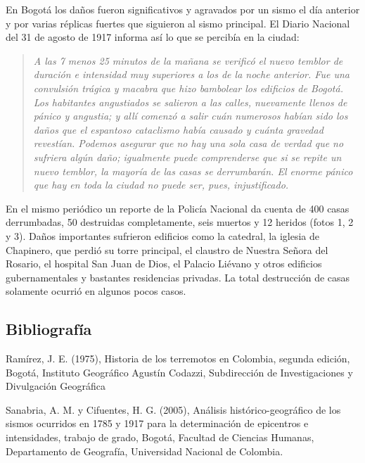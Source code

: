 \documentclass[10pt,twoside]{article}
\begin{document}
\begin{multicols}{2}
En Bogotá los daños fueron significativos y agravados por un sismo el día anterior y por varias réplicas fuertes que siguieron al sismo principal. El Diario Nacional del 31 de agosto de 1917 informa así lo que se percibía en la ciudad:
\begin{quote}
\textit{A las 7 menos 25 minutos de la mañana se verificó el nuevo temblor de duración e intensidad muy superiores a los de la noche anterior. Fue una convulsión trágica y macabra que hizo bambolear los edificios de Bogotá. Los habitantes angustiados se salieron a las calles, nuevamente llenos de pánico y angustia; y allí
comenzó a salir cuán numerosos habían sido los daños que el espantoso cataclismo había causado y cuánta gravedad revestían. Podemos asegurar que no hay una sola casa de verdad que no sufriera algún daño; igualmente puede comprenderse que si se repite un nuevo temblor, la mayoría de las casas se derrumbarán. El enorme pánico que hay en toda la ciudad no puede ser,
pues, injustificado.}
\end{quote}
En el mismo periódico un reporte de la Policía Nacional da cuenta de 400 casas derrumbadas, 50 destruidas completamente, seis muertos y 12 heridos (fotos 1, 2 y 3). Daños importantes sufrieron edificios como la catedral, la iglesia de Chapinero, que perdió su torre principal, el claustro de Nuestra Señora del Rosario, el hospital San Juan de Dios, el Palacio Liévano y otros edificios gubernamentales y bastantes residencias privadas. La total destrucción de casas solamente ocurrió en algunos pocos casos.
\subsection*{Bibliografía}
Ramírez, J. E. (1975), Historia de los terremotos en Colombia, segunda edición, Bogotá, Instituto Geográfico Agustín Codazzi, Subdirección de Investigaciones y Divulgación Geográfica

Sanabria, A. M. y Cifuentes, H. G. (2005), Análisis histórico-geográfico de los sismos ocurridos en 1785 y 1917 para la determinación de epicentros e intensidades, trabajo de grado, Bogotá, Facultad de Ciencias Humanas, Departamento de Geografía, Universidad Nacional de Colombia.

\end{multicols}
\end{document}
